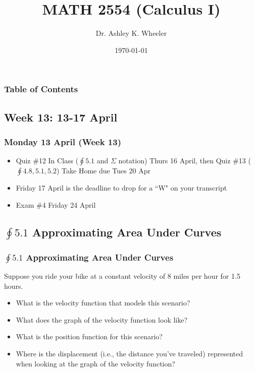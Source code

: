 \documentclass[14pt]{beamer}
\title[Cal I S2015]{MATH 2554 (Calculus I)}
\subtitle{}
\author[Wheeler]{Dr. Ashley K. Wheeler}
\institute{University of Arkansas}
\date{\today}
\begin{document}
\maketitle

\begin{frame}
\frametitle{Table of Contents}
\tableofcontents
\end{frame}


\begin{frame}
\section[Week 13]{Week 13: 13-17 April}
\frametitle{Monday 13 April (Week 13)}
\small
\begin{itemize}
\item Quiz \#12 In Class ($\oint 5.1$ and $\Sigma$ notation) Thurs 16 April, then Quiz \#13 ($\oint 4.8, 5.1, 5.2$) Take Home due Tues 20 Apr
\item \alert{Friday 17 April is the deadline to drop for a ``W" on your transcript}
\item Exam \#4 Friday 24 April
\end{itemize}
\end{frame}

\begin{frame}
\subsection[$\oint 5.1$ Approximating Area Under Curves]{$\oint 5.1$ Approximating Area Under Curves}
\frametitle{$\oint 5.1$ Approximating Area Under Curves}
\small
\begin{ex} Suppose you ride your bike at a constant velocity of 8 miles per hour for 1.5 hours.
\begin{itemize}
\item What is the velocity function that models this scenario?
\item What does the graph of the velocity function look like?
\item What is the position function for this scenario?
\item Where is the displacement (i.e., the distance you've traveled) represented when looking at the graph of the velocity function?
\end{itemize}
\end{ex}
\end{frame}
\end{document}
